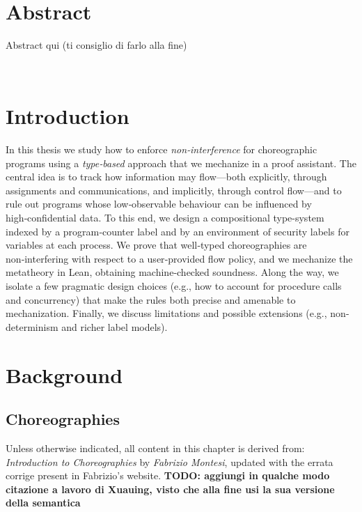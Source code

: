 \documentclass[12pt,a4paper,twoside]{book}
\begin{document}
\newpage~\newpage

\chapter*{Abstract}
Abstract qui (ti consiglio di farlo alla fine)
\topmargin=-1cm

\tableofcontents
\thispagestyle{empty}

\newpage~\newpage


\raggedbottom
\chapter{Introduction} \label{chap:intro}
\pagestyle{plain}
\setcounter{page}{1}
In this thesis we study how to enforce \emph{non‑interference} for choreographic programs using a \emph{type‑based} approach that we mechanize in a proof assistant.
The central idea is to track how information may flow—both explicitly, through assignments and communications, and implicitly, through control flow—and to rule out programs whose low‑observable behaviour can be influenced by high‑confidential data.
To this end, we design a compositional type-system indexed by a program‑counter label and by an environment of security labels for variables at each process.
We prove that well‑typed choreographies are non‑interfering with respect to a user‑provided flow policy, and we mechanize the metatheory in Lean, obtaining machine‑checked soundness.
Along the way, we isolate a few pragmatic design choices (e.g., how to account for procedure calls and concurrency) that make the rules both precise and amenable to mechanization.
Finally, we discuss limitations and possible extensions (e.g., non-determinism and richer label models).

\chapter{Background} \label{chap:background}
\section{Choreographies}
\label{background:choreographies}
Unless otherwise indicated, all content in this chapter is derived from: \textit{Introduction to Choreographies\cite{montesi2023introduction}} by \textit{Fabrizio Montesi}, updated with the errata corrige present in Fabrizio's website\cite{montesiChoreographies}.
\textbf{TODO: aggiungi in qualche modo citazione a lavoro di Xuauing, visto che alla fine usi la sua versione della semantica}
\vspace{10pt}
\end{document}
